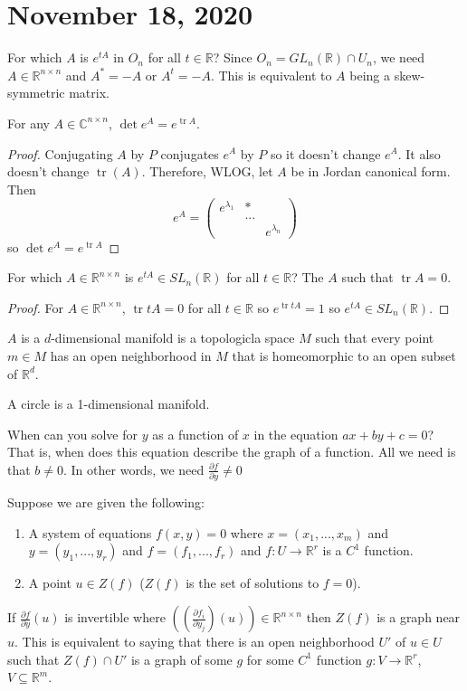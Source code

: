 \documentclass{article}
\newcommand{\C}{\mathbb{C}}
\newcommand{\R}{\mathbb{R}}
\newcommand{\ra}[1][]{\xrightarrow{#1}}
\DeclareMathOperator{\tr}{tr}
\begin{document}
\section{November 18, 2020}
For which $A$ is $e^{tA}$ in $O_n$ for all $t\in \R$?
Since $O_n=GL_n(\R)\cap U_n$, we need $A\in \R^{n\times n}$ and $A^*=-A$ or $A^t=-A$. This is equivalent to $A$ being a skew-symmetric matrix.
\begin{lemma}
For any $A\in \C^{n\times n}$, $\det e^A=e^{\tr A}$.
\end{lemma}
\begin{proof}
Conjugating $A$ by $P$ conjugates $e^A$ by $P$ so it doesn't change $e^A$. It also doesn't change $\tr(A)$. Therefore, WLOG, let $A$ be in Jordan canonical form.
Then
$$e^A=\begin{pmatrix}
e^{\lambda_1}&*&\\&...&\\&&e^{\lambda_n}
\end{pmatrix}
$$ so $\det e^A=e^{\tr A}$
\end{proof}
For which $A\in\R^{n\times n}$ is $e^{tA}\in SL_n(\R)$ for all $t\in \R$? The $A$ such that $\tr A=0$.
\begin{proof}
For $A\in \R^{n\times n}$, $\tr tA=0$ for all $t\in \R$ so $e^{\tr tA}=1$ so $e^{tA}\in SL_n(\R)$.
\end{proof}
\begin{definition}
$A$ is a $d$-dimensional manifold is a topologicla space $M$ such that every point $m\in M$ has an open neighborhood in $M$ that is homeomorphic to an open subset of $\R^d$.
\end{definition}
\begin{example}
A circle is a 1-dimensional manifold.
\end{example}
When can you solve for $y$ as a function of $x$ in the equation $ax+by+c=0$? That is, when does this equation describe the graph of a function. All we need is that $b\neq 0$. In other words, we need $\frac{\partial f}{\partial y}\neq 0$
\begin{theorem}
Suppose we are given the following:
\begin{enumerate}
    \item A system of equations $f(x,y)=0$ where $x=(x_1,...,x_m)$ and $y=(y_1,...,y_r)$ and $f=(f_1,...,f_r)$ and $f:U\ra \R^r$ is a $C^1$ function.
    \item A point $u\in Z(f)$ ($Z(f)$ is the set of solutions to $f=0$).
\end{enumerate}
If $\frac{\partial f}{\partial y}(u)$ is invertible where $((\frac{\partial f_i}{\partial y_j})(u))\in \R^{n\times n}$ then $Z(f)$ is a graph near $u$. This is equivalent to saying that there is an open neighborhood $U'$ of $u\in U$ such that $Z(f)\cap U'$ is a graph of some $g$ for some $C^1$ function $g:V\ra\R^r$, $V\subseteq\R^m$.
\end{theorem}
\end{document}
